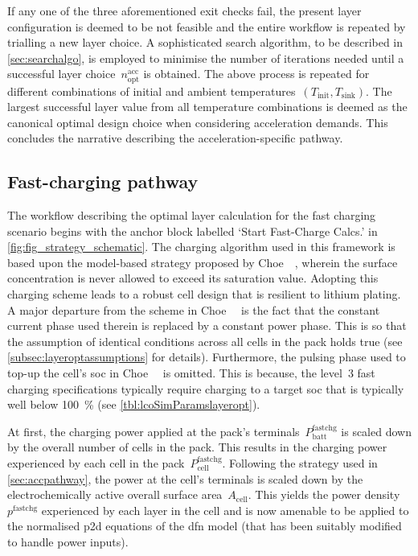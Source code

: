 If  any one  of the  three aforementioned  exit checks  fail, the  present layer
configuration is deemed  to be not feasible and the  entire workflow is repeated
by  trialling a  new  layer  choice. A  sophisticated  search  algorithm, to  be
described  in  \cref{sec:searchalgo}, is  employed  to  minimise the  number  of
iterations needed  until a successful layer  choice~$n_\text{opt}^\text{acc}$ is
obtained. The  above process is  repeated for different combinations  of initial
and  ambient temperatures~\mbox{$(T_\text{init},  T_\text{sink})$}. The  largest
successful  layer value  from  all  temperature combinations  is  deemed as  the
canonical  optimal design  choice  when considering  acceleration demands.  This
concludes the narrative describing the acceleration-specific pathway.


\subsection{Fast-charging pathway}\label{sec:fastchgpathway}

The  workflow describing  the optimal  layer calculation  for the  fast charging
scenario begins  with the  anchor block labelled  `Start Fast-Charge  Calcs.' in
\cref{fig:fig_strategy_schematic}. The charging algorithm used in this framework
is based  upon the model-based strategy  proposed by Choe~\etal~\cite{Choe2013},
wherein  the surface  concentration is  never allowed  to exceed  its saturation
value.  Adopting  this charging  scheme  leads  to  a  robust cell  design  that
is  resilient  to  lithium  plating.  A  major  departure  from  the  scheme  in
Choe~\etal~\cite{Choe2013}  is the  fact that  the constant  current phase  used
therein is replaced  by a constant power  phase. This is so  that the assumption
of  identical  conditions  across  all  cells   in  the  pack  holds  true  (see
\cref{subsec:layeroptassumptions} for  details). Furthermore, the  pulsing phase
used to  top-up the cell's  \gls{soc} in Choe~\etal~\cite{Choe2013}  is omitted.
This  is because,  the level~3  fast charging  specifications typically  require
charging to a  target \gls{soc} that is typically  well below \SI{100}{\percent}
(see \cref{tbl:lcoSimParamslayeropt}).

At     first,     the    charging     power     applied     at    the     pack's
terminals~$P_\text{batt}^\text{fastchg}$ is scaled down by the overall number of
cells in the pack.  This results in the charging power  experienced by each cell
in  the  pack~$P_\text{cell}^\text{fastchg}$.  Following the  strategy  used  in
\cref{sec:accpathway}, the power  at the cell's terminals is scaled  down by the
electrochemically active  overall surface area~$A_\text{cell}$. This  yields the
power density~$p^{\text{fastchg}}$ experienced by each  layer in the cell and is
now  amenable  to be  applied  to  the  normalised  \gls{p2d} equations  of  the
\gls{dfn} model (that has been suitably modified to handle power inputs).

